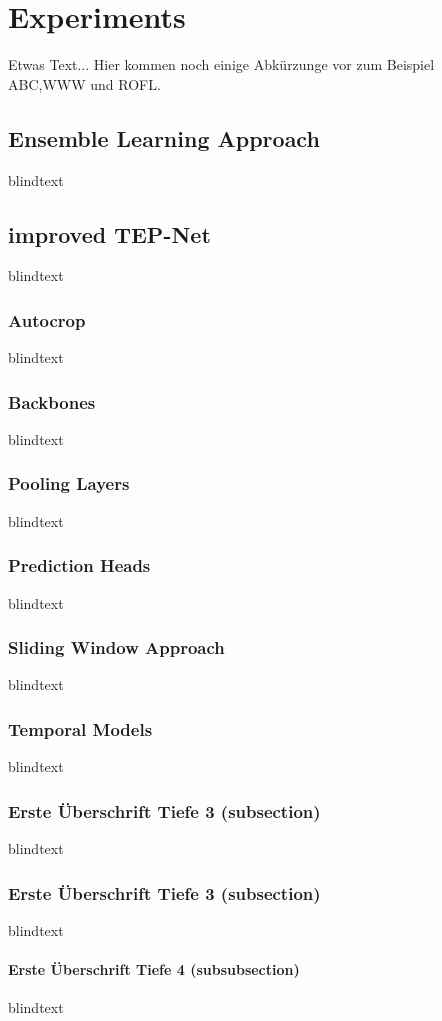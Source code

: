 \chapter{Experiments}
Etwas Text... Hier kommen noch einige Abkürzunge vor zum Beispiel \ac{ABC},\ac{WWW} und \ac{ROFL}.

\section{Ensemble Learning Approach}
blindtext

\section{improved TEP-Net}
blindtext

\subsection{Autocrop}
blindtext

\subsection{Backbones}
blindtext

\subsection{Pooling Layers}
blindtext

\subsection{Prediction Heads}
blindtext

\subsection{Sliding Window Approach}
blindtext

\subsection{Temporal Models}
blindtext

\subsection{Erste Überschrift Tiefe 3 (subsection)}
blindtext

\subsection{Erste Überschrift Tiefe 3 (subsection)}
blindtext

\subsubsection{Erste Überschrift Tiefe 4 (subsubsection)}
blindtext
